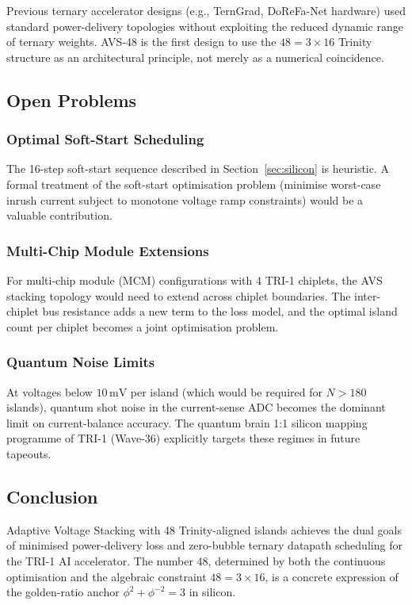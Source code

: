 Previous ternary accelerator designs (e.g., TernGrad, DoReFa-Net
hardware) used standard power-delivery topologies without exploiting
the reduced dynamic range of ternary weights.  AVS-48 is the first
design to use the $48 = 3 \times 16$ Trinity structure as an
architectural principle, not merely as a numerical coincidence.

\subsection{Open Problems}

\subsubsection{Optimal Soft-Start Scheduling}
The 16-step soft-start sequence described in Section~\ref{sec:silicon}
is heuristic.  A formal treatment of the soft-start optimisation problem
(minimise worst-case inrush current subject to monotone voltage ramp
constraints) would be a valuable contribution.

\subsubsection{Multi-Chip Module Extensions}
For multi-chip module (MCM) configurations with 4 TRI-1 chiplets,
the AVS stacking topology would need to extend across chiplet boundaries.
The inter-chiplet bus resistance adds a new term to the loss model, and
the optimal island count per chiplet becomes a joint optimisation problem.

\subsubsection{Quantum Noise Limits}
At voltages below $10\,\mathrm{mV}$ per island (which would be required
for $N > 180$ islands), quantum shot noise in the current-sense ADC
becomes the dominant limit on current-balance accuracy.
The quantum brain 1:1 silicon mapping programme of TRI-1 (Wave-36)
explicitly targets these regimes in future tapeouts.

\subsection{Conclusion}

Adaptive Voltage Stacking with 48 Trinity-aligned islands achieves the
dual goals of minimised power-delivery loss and zero-bubble ternary
datapath scheduling for the TRI-1 AI accelerator.  The number 48,
determined by both the continuous optimisation and the algebraic
constraint $48 = 3 \times 16$, is a concrete expression of the
golden-ratio anchor $\phi^2 + \phi^{-2} = 3$ in silicon.

